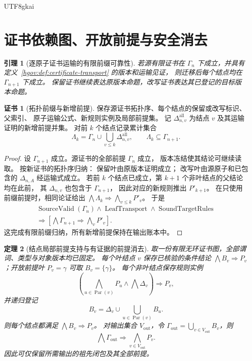 \documentclass[12pt,a4paper,openany,notitlepage]{report}
\theoremstyle{plain}
\newtheorem{theorem}{定理}[chapter]
\newtheorem{lemma}[theorem]{引理}
\theoremstyle{definition}
\newtheorem*{certificate}{证书}
\theoremstyle{remark}
\begin{document}
\begin{CJK*}{UTF8}{gkai}
\section{证书依赖图、开放前提与安全消去}
\label{exp:gov:proof-ledger-section}

\begin{lemma}[逐原子证书运输的有限前缀可靠性]
\label{hgov:lem:transport-prefix}
若源有限证书在 $\Gamma_n$ 下成立，并具有
定义~\ref{hgov:def:certificate-transport} 的版本和运输见证，
则迁移后每个结点均在 $\Gamma_{n+1}$ 下成立。
保留证书继续表达原版本命题，改写证书表达其已登记的目标版本命题。
\end{lemma}
\begin{certificate}[拓扑前缀与新增前提]
保存源证书拓扑序、每个结点的保留或改写标识、父索引、
原子运输公式、新规则实例及局部前提集。
记 $\Delta_{n,v}^{\mathrm{all}}$ 为结点 $v$ 及其运输证明的新增前提并集。
对前 $k$ 个结点记录累计集合
\[
 \Lambda_k=\Gamma_n\cup
 \bigcup_{v\le k}\Delta_{n,v}^{\mathrm{all}},
 \qquad \Lambda_k\subseteq\Gamma_{n+1}.
\]
\end{certificate}
\begin{proof}
设 $\Gamma_{n+1}$ 成立。源证书的全部前提 $\Gamma_n$ 成立，
版本冻结使其结论可继续读取。
按新证书的拓扑序归纳：
保留叶由原版本证明成立；
改写叶由源原子和已包含的 $\Delta_{n,A}$ 经运输式成立。
若前 $k$ 个结点已成立，第 $k+1$ 个非叶结点的父结论均在此前，
其 $\Delta_{n,v}$ 也包含于 $\Gamma_{n+1}$，
因此对应的新规则推出 $P'_{k+1}$。
在只使用前缀前提时，相同论证给出
$\bigwedge\Lambda_k\Rightarrow\bigwedge_{v\le k}P'_v$。
于是
\[
 \begin{gathered}
 \operatorname{SourceValid}(\Gamma_n)
 \land\operatorname{LeafTransport}
 \land\operatorname{SoundTargetRules}\\
 \Longrightarrow
 \left[
 \bigwedge\Gamma_{n+1}
 \Rightarrow\bigwedge_{v}P'_v
 \right].
 \end{gathered}
\]
这完成有限前缀归纳，所有新增前提保持在输出账本中。
\end{proof}

\begin{theorem}[结点局部前提支持与有证据的前提消去]
\label{exp:gov:premise-support}
取一份有限无环证书图，全部谓词、类型与对象版本均已固定。
每个叶结点 $v$ 保存已核验的条件结论
$\bigwedge B_v\Rightarrow P_v$；开放前提叶 $P_v=\gamma$ 可取
$B_v=\{\gamma\}$。
每个非叶结点保存规则实例
\[
 \left(\bigwedge_{u\in\operatorname{Par}(v)}P_u
       \land\bigwedge\Delta_v\right)\Rightarrow P_v,
\]
并递归登记
\[
 B_v=\Delta_v\cup\bigcup_{u\in\operatorname{Par}(v)}B_u.
\]
则每个结点都满足 $\bigwedge B_v\Rightarrow P_v$。
对输出集合 $V_{\mathrm{out}}$，令
$\Gamma_{\mathrm{out}}=\bigcup_{v\in V_{\mathrm{out}}}B_v$，则
\[
 \bigwedge\Gamma_{\mathrm{out}}
 \Rightarrow\bigwedge_{v\in V_{\mathrm{out}}}P_v.
\]
因此可仅保留所需输出的祖先闭包及其全部前提。


\end{theorem}
\end{CJK*}
\end{document}
